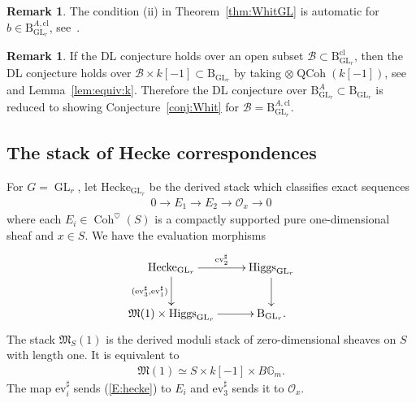\documentclass[11pt,oneside,a4paper,mathscr]{amsart}
\theoremstyle{definition}
\newtheorem{remark}[thm]{Remark}
\newcommand{\QCoh}{\operatorname{QCoh}}
\newcommand{\cB}{\mathcal{B}}
\newcommand{\ev}{\mathrm{ev}}
\newcommand{\bgm}{B\mathbb{G}_m}
\newcommand{\rB}{\mathrm{B}}
\newcommand{\Coh}{\operatorname{Coh}}
\newcommand{\GL}{\operatorname{GL}}
\newcommand{\Hig}{\mathrm{Higgs}}
\begin{document}
\begin{remark}\label{rmk:thm2}
The condition (ii) in Theorem~\ref{thm:WhitGL} is automatic 
for $b\in \rB_{\GL_r}^{A, \mathrm{cl}}$, see~\cite[Example~4.19]{TodaGL2}. 
\end{remark}

\begin{remark}\label{rmk:thm3}
    If the DL conjecture holds over an open subset 
    $\cB \subset \rB_{\GL_r}^{\mathrm{cl}}$, then the DL conjecture holds 
    over $\cB \times k[-1] \subset \rB_{\GL_r}$ by taking $\otimes \QCoh(k[-1])$, 
    see~\cite[Remark~2.15]{TodaGL2} and Lemma~\ref{lem:equiv:k}. 
    Therefore the DL conjecture over $\rB_{\GL_r}^A \subset \rB_{\GL_r}$
    is reduced to showing Conjecture~\ref{conj:Whit} for $\cB=\rB_{\GL_r}^{A, \mathrm{cl}}$. 
\end{remark}

\subsection{The stack of Hecke correspondences}
For $G=\GL_r$, let
$
    \mathrm{Hecke}_{\GL_r}
$
be the derived stack which 
classifies exact sequences 
\begin{align}\label{E:hecke}
    0\to E_1 \to E_2 \to \mathcal{O}_x \to 0
\end{align}
where each $E_i \in \Coh^{\heartsuit}(S)$ is a compactly supported pure 
one-dimensional sheaf and $x\in S$. 
We have the evaluation morphisms 
\begin{align*}
    \xymatrix{
\mathrm{Hecke}_{\GL_r} \ar[r]^-{\ev_2^{\sharp}} \ar[d]_{(\ev_3^{\sharp}, \ev_1^{\sharp})} & 
\Hig_{\GL_r} \ar[d] \\
\mathfrak{M}(1) \times \Hig_{\GL_r} \ar[r] & \rB_{\GL_r}.
    }
\end{align*}
The stack $\mathfrak{M}_S(1)$ is the derived moduli stack of 
zero-dimensional sheaves on $S$ with length one. It is equivalent to 
\begin{align*}
    \mathfrak{M}(1) \simeq S\times k[-1] \times \bgm.
\end{align*}
The map $\ev_i^{\sharp}$ sends (\ref{E:hecke}) to $E_i$ and $\ev_3^{\sharp}$ 
sends it to $\mathcal{O}_x$. 
\end{document}
